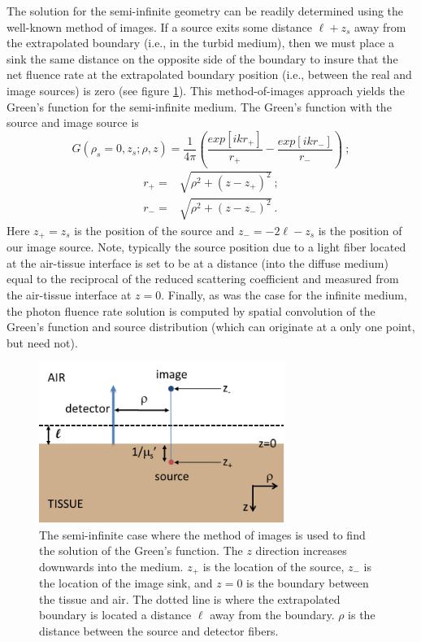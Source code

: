 The solution for the semi-infinite geometry can be readily determined using the well-known method of images. If a source exits some distance $\ell + z_s$ away from the extrapolated boundary (i.e., in the turbid medium), then we must place a sink the same distance on the opposite side of the boundary to insure that the net fluence rate at the extrapolated boundary position (i.e., between the real and image sources) is zero (see figure \ref{fig:semiinf}). This method-of-images approach yields the Green's function for the semi-infinite medium. The Green's function with the source and image source is
%
\begin{equation}
\label{semisoln}
G(\rho_s=0,z_s;\rho,z) = \frac{1}{4\pi} \left( \frac{exp[ikr_+]}{r_+} 
- \frac{exp[ikr_-]}{r_-} \right) \ ;
\end{equation}
%
\begin{eqnarray}
\label{ext_both}
r_{+} = & \sqrt{\rho^2+(z-z_{+})^2} \ ; \nonumber \\
r_{-} = & \sqrt{\rho^2+(z-z_{-})^2} \ .
\end{eqnarray}
%
\noindent
Here $z_+=z_s$ is the position of the source and $z_-=-2\ell-z_s$ is the position of our image source. Note, typically the source position due to a light fiber located at the air-tissue interface is set to be at a distance (into the diffuse medium) equal to the reciprocal of the reduced scattering coefficient and measured from the air-tissue interface at $z=0$.  Finally, as was the case for the infinite medium, the photon fluence rate solution is computed by spatial convolution of the Green's function and source distribution (which can originate at a only one point, but need not).
%
\begin{figure}[t]
\centering
\includegraphics[width=8cm]{./figures/2_Theory/semiinf.png}
\caption[Diagram of the semi-infinite case]{The semi-infinite case where the method of images is used to find the solution of the Green's function. The $z$ direction increases downwards into the medium. $z_+$ is the location of the source, $z_-$ is the location of the image sink, and $z=0$ is the boundary between the tissue and air. The dotted line is where the extrapolated boundary is located a distance $\ell$ away from the boundary. $\rho$ is the distance between the source and detector fibers.}
\label{fig:semiinf}
\end{figure}
%
